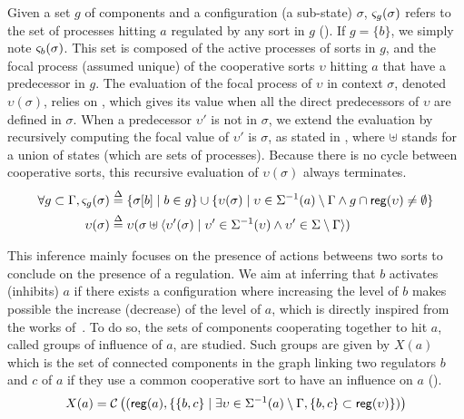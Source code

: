 Given a set $g$ of components and a configuration (\ie a sub-state) $\sigma$, $\varsigma_g(\sigma)$
refers to the set of processes hitting $a$ regulated by any sort in $g$ ().
If $g=\{b\}$, we simply note $\varsigma_b(\sigma)$.
This set is composed of the active processes of sorts in $g$, and the focal process (assumed
unique) of the cooperative sorts $\upsilon$ hitting $a$ that have a predecessor in $g$.
The evaluation of the focal process of $\upsilon$ in context $\sigma$, denoted $\upsilon(\sigma)$,
relies on , which gives its value when all the direct predecessors of
$\upsilon$ are defined in $\sigma$.
When a predecessor $\upsilon'$ is not in $\sigma$, we extend the evaluation by recursively computing
the focal value of $\upsilon'$ is $\sigma$, as stated in ,
where $\uplus$ stands for a union of states (which are sets of processes).
Because there is no cycle between cooperative sorts, this recursive evaluation of $\upsilon(\sigma)$
always terminates.
\begin{align}
\forall g\subset \Gamma,
  \varsigma_g(\sigma) & \stackrel{\Delta}= \{ \sigma[b] \mid b\in g \} \cup \{ \upsilon(\sigma) \mid
\upsilon\in\Sigma^{-1}(a) \setminus \Gamma \wedge g\cap \mathsf{reg}({\upsilon}) \neq \emptyset \}
\label{eq:ctx-sigma}
\\
\upsilon(\sigma) & \stackrel{\Delta}=
\upsilon(\sigma \uplus \langle \upsilon'(\sigma) \mid 
  \upsilon'\in\Sigma^{-1}(\upsilon) \wedge
  \upsilon'\in\Sigma\setminus\Gamma  \rangle)
\label{eq:cooperative-eval}
\end{align}

This inference mainly focuses on the presence of actions betweens two sorts to conclude on the presence of a regulation.
We aim at inferring that $b$ activates (inhibits) $a$ if there exists a configuration where increasing
the level of $b$ makes possible the increase (decrease) of the level of $a$,
which is directly inspired from the works of~\cite{Richard2010378}.
To do so, the sets of components cooperating together to hit $a$, called groups of influence of $a$, are studied.
Such groups are given by $X(a)$ which is the set of connected components in the graph linking two regulators
$b$ and $c$ of $a$ if they use a common cooperative sort to have an influence on $a$ ().
\begin{equation}
X(a) = \mathcal C\left( (\mathsf{reg}({a}), \{ \{b,c\} \mid
        \exists \upsilon\in \Sigma^{-1}(a) \setminus \Gamma,
        \{b,c\} \subset \mathsf{reg}({\upsilon}) \}) \right)
\label{eq:influence-groups}
\end{equation}

